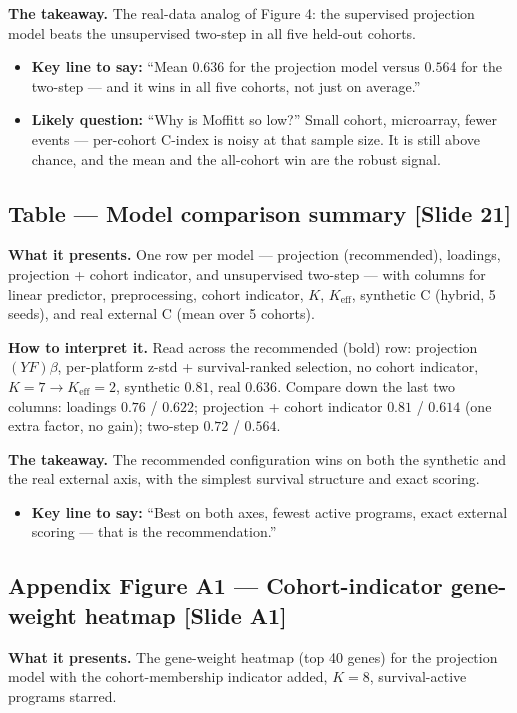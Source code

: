 \documentclass[11pt]{article}
\newcommand{\sectionlabel}[1]{\textbf{#1}}
\begin{document}
\sectionlabel{The takeaway.} The real-data analog of Figure 4: the supervised projection model beats
the unsupervised two-step in all five held-out cohorts.

\begin{itemize}
\item \sectionlabel{Key line to say:} ``Mean $0.636$ for the projection model versus $0.564$ for the
two-step --- and it wins in all five cohorts, not just on average.''
\item \sectionlabel{Likely question:} ``Why is Moffitt so low?'' Small cohort, microarray, fewer
events --- per-cohort C-index is noisy at that sample size. It is still above chance, and the mean
and the all-cohort win are the robust signal.
\end{itemize}

\subsection*{Table --- Model comparison summary [Slide 21]}
\sectionlabel{What it presents.} One row per model --- projection (recommended), loadings, projection
+ cohort indicator, and unsupervised two-step --- with columns for linear predictor, preprocessing,
cohort indicator, $K$, $K_{\text{eff}}$, synthetic C (hybrid, 5 seeds), and real external C (mean
over 5 cohorts).

\sectionlabel{How to interpret it.} Read across the recommended (bold) row: projection $(YF)\beta$,
per-platform z-std + survival-ranked selection, no cohort indicator, $K = 7 \to K_{\text{eff}} = 2$,
synthetic $0.81$, real $0.636$. Compare down the last two columns: loadings $0.76$ / $0.622$;
projection + cohort indicator $0.81$ / $0.614$ (one extra factor, no gain); two-step $0.72$ / $0.564$.

\sectionlabel{The takeaway.} The recommended configuration wins on both the synthetic and the real
external axis, with the simplest survival structure and exact scoring.

\begin{itemize}
\item \sectionlabel{Key line to say:} ``Best on both axes, fewest active programs, exact external
scoring --- that is the recommendation.''
\end{itemize}

\subsection*{Appendix Figure A1 --- Cohort-indicator gene-weight heatmap [Slide A1]}
\sectionlabel{What it presents.} The gene-weight heatmap (top 40 genes) for the projection model with
the cohort-membership indicator added, $K = 8$, survival-active programs starred.
\end{document}
